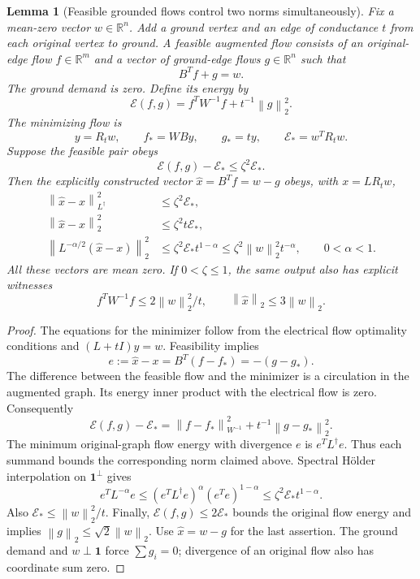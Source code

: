 \documentclass[11pt]{article}
\newtheorem{lemma}{Lemma}
\newcommand{\R}{\mathbb R}
\newcommand{\norm}[1]{\left\lVert #1\right\rVert}
\begin{document}
\begin{lemma}[Feasible grounded flows control two norms simultaneously]
\label{lem:ground}
Fix a mean-zero vector $w\in\R^n$. Add a ground vertex and an edge of
conductance $t$ from each original vertex to ground. A feasible augmented
flow consists of an original-edge flow $f\in\R^m$ and a vector of
ground-edge flows $g\in\R^n$ such that
\[
 B^Tf+g=w.
\]
The ground demand is zero. Define its energy by
\[
 \mathcal E(f,g)=f^TW^{-1}f+t^{-1}\norm g_2^2.
\]
The minimizing flow is
\[
 y=R_tw,\qquad f_*=WBy,\qquad g_*=ty,
 \qquad \mathcal E_*=w^TR_tw.
\]
Suppose the feasible pair obeys
\[
 \mathcal E(f,g)-\mathcal E_*\le\zeta^2\mathcal E_*.
\]
Then the explicitly constructed vector $\widehat x=B^Tf=w-g$ obeys,
with $x=LR_tw$,
\begin{align*}
 \norm{\widehat x-x}_{L^\dagger}^2
       &\le\zeta^2\mathcal E_*,\\
 \norm{\widehat x-x}_2^2
       &\le\zeta^2t\mathcal E_*,\\
 \norm{L^{-\alpha/2}(\widehat x-x)}_2^2
       &\le\zeta^2\mathcal E_*t^{1-\alpha}
        \le\zeta^2\norm w_2^2t^{-\alpha},\qquad 0<\alpha<1.
\end{align*}
All these vectors are mean zero. If $0<\zeta\le1$, the same output
also has explicit witnesses
\[
 f^TW^{-1}f\le 2\norm w_2^2/t,
 \qquad \norm{\widehat x}_2\le3\norm w_2.
\]
\end{lemma}
\begin{proof}
The equations for the minimizer follow from the electrical flow
optimality conditions and $(L+tI)y=w$. Feasibility implies
\[
 e:=\widehat x-x=B^T(f-f_*)=-(g-g_*).
\]
The difference between the feasible flow and the minimizer is a
circulation in the augmented graph. Its energy inner product with the
electrical flow is zero. Consequently
\[
 \mathcal E(f,g)-\mathcal E_*
  =\norm{f-f_*}_{W^{-1}}^2+t^{-1}\norm{g-g_*}_2^2.
\]
The minimum original-graph flow energy with divergence $e$ is
$e^TL^\dagger e$. Thus each summand bounds the corresponding norm
claimed above. Spectral H\"older interpolation on $\mathbf1^\perp$
gives
\[
 e^TL^{-\alpha}e
 \le (e^TL^\dagger e)^\alpha(e^Te)^{1-\alpha}
 \le\zeta^2\mathcal E_*t^{1-\alpha}.
\]
Also $\mathcal E_*\le\norm w_2^2/t$.
Finally, $\mathcal E(f,g)\le2\mathcal E_*$ bounds the original flow
energy and implies $\norm g_2\le\sqrt2\norm w_2$. Use
$\widehat x=w-g$ for the last assertion. The ground demand and
$w\perp\mathbf1$ force $\sum g_i=0$; divergence of an original
flow also has coordinate sum zero.
\end{proof}
\end{document}
